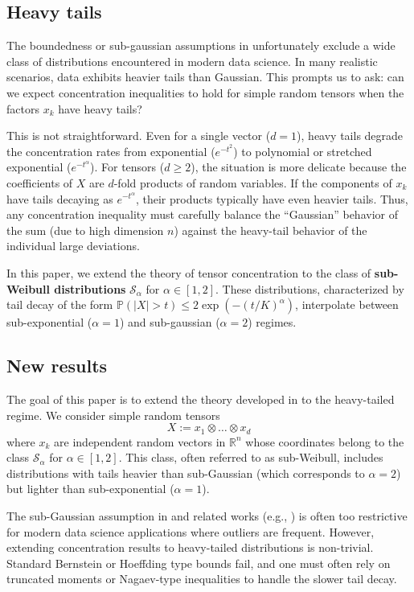 \documentclass[11pt]{amsart}
\theoremstyle{definition}
\theoremstyle{remark}
\begin{document}
\subsection{Heavy tails}
The boundedness or sub-gaussian assumptions in \cite{Vershynin2020} unfortunately exclude a wide class of distributions encountered in modern data science. In many realistic scenarios, data exhibits heavier tails than Gaussian. This prompts us to ask: can we expect concentration inequalities to hold for simple random tensors when the factors $x_k$ have heavy tails?

This is not straightforward. Even for a single vector ($d=1$), heavy tails degrade the concentration rates from exponential ($e^{-t^2}$) to polynomial or stretched exponential ($e^{-t^\alpha}$). For tensors ($d \ge 2$), the situation is more delicate because the coefficients of $X$ are $d$-fold products of random variables. If the components of $x_k$ have tails decaying as $e^{-t^\alpha}$, their products typically have even heavier tails. Thus, any concentration inequality must carefully balance the ``Gaussian'' behavior of the sum (due to high dimension $n$) against the heavy-tail behavior of the individual large deviations.

In this paper, we extend the theory of tensor concentration to the class of \textbf{sub-Weibull distributions} $\mathcal{S}_\alpha$ for $\alpha \in [1, 2]$. These distributions, characterized by tail decay of the form $\mathbb{P}(|X| > t) \le 2 \exp(-(t/K)^\alpha)$, interpolate between sub-exponential ($\alpha=1$) and sub-gaussian ($\alpha=2$) regimes.

\subsection{New results}
The goal of this paper is to extend the theory developed in \cite{Vershynin2020} to the heavy-tailed regime. We consider simple random tensors
\begin{equation*}
    X := x_1 \otimes \dots \otimes x_d
\end{equation*}
where $x_k$ are independent random vectors in $\mathbb{R}^n$ whose coordinates belong to the class $\mathcal{S}_{\alpha}$ for $\alpha \in [1, 2]$. This class, often referred to as sub-Weibull, includes distributions with tails heavier than sub-Gaussian (which corresponds to $\alpha=2$) but lighter than sub-exponential ($\alpha=1$).

The sub-Gaussian assumption in \cite{Vershynin2020} and related works (e.g., \cite{RudelsonVershynin2013}) is often too restrictive for modern data science applications where outliers are frequent. However, extending concentration results to heavy-tailed distributions is non-trivial. Standard Bernstein or Hoeffding type bounds fail, and one must often rely on truncated moments or Nagaev-type inequalities to handle the slower tail decay.
\end{document}
